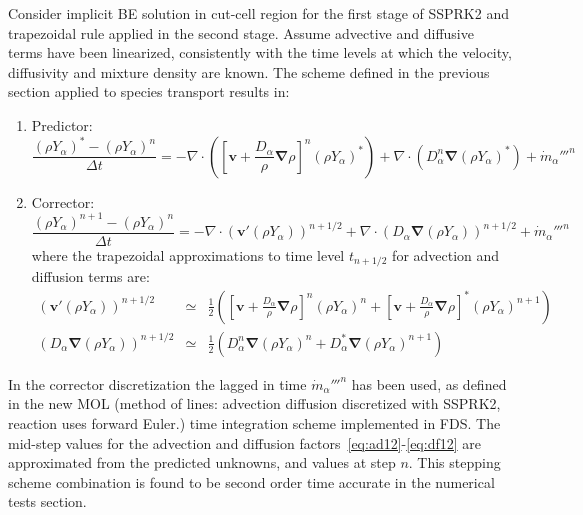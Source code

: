 Consider implicit BE solution in cut-cell region for the first stage of SSPRK2 and trapezoidal rule applied in the second stage. Assume advective and diffusive terms have been linearized, consistently with the time levels at which the velocity, diffusivity and mixture density are known. The scheme defined in the previous section applied to species transport results in:
%
\begin{enumerate}
  \item Predictor:
%
\begin{equation}
\frac{ (\rho Y_\alpha)^{*} - (\rho Y_\alpha)^n}{\Delta t} = - \nabla \cdot \left(  \left[ \mathbf{v} +
\frac{D_\alpha}{\rho} \boldsymbol{\nabla} \rho \right]^{n} (\rho Y_\alpha)^{*} \right) +
\nabla \cdot \left( D_\alpha^n \boldsymbol{\nabla}  (\rho Y_\alpha )^{*} \right) + \dot{m}_\alpha'''^{n} \label{eq:pred}
\end{equation}
%
  \item Corrector:
%
\begin{equation}
\frac{ (\rho Y_\alpha)^{n+1} - (\rho Y_\alpha)^n}{\Delta t} = - \nabla \cdot \left(  \mathbf{v}' (\rho Y_\alpha) \right)^{n+1/2} + \nabla \cdot \left( D_\alpha \boldsymbol{\nabla}  (\rho Y_\alpha ) \right)^{n+1/2} + \dot{m}_\alpha'''^{n} \label{eq:corr}
\end{equation}
%
where the trapezoidal approximations to time level $t_{n+1/2}$ for advection and diffusion terms are:
%
\begin{eqnarray}
  \left(  \mathbf{v}'(\rho Y_\alpha) \right)^{n+1/2} & \simeq &
  \frac{1}{2} \left( \left[ \mathbf{v} + \frac{D_\alpha}{\rho} \boldsymbol{\nabla} \rho \right]^n (\rho Y_\alpha)^{n} +
                           \left[ \mathbf{v} + \frac{D_\alpha}{\rho} \boldsymbol{\nabla} \rho \right]^* (\rho Y_\alpha)^{n+1} \right)
                           \label{eq:ad12}  \\
  \left( D_\alpha \boldsymbol{\nabla}  (\rho Y_\alpha ) \right)^{n+1/2}   & \simeq &
  \frac{1}{2} \left(  D_\alpha^{n} \boldsymbol{\nabla}  (\rho Y_\alpha )^{n} +
                            D_\alpha^* \boldsymbol{\nabla}  (\rho Y_\alpha )^{n+1}  \right) \label{eq:df12}
\end{eqnarray}
%
\end{enumerate}
%
In the corrector discretization the lagged in time $\dot{m}_\alpha'''^{n}$ has been used, as defined in the new MOL (method of lines: advection diffusion discretized with SSPRK2, reaction uses forward Euler.) time integration scheme implemented in FDS. The mid-step values for the advection and diffusion factors~\eqref{eq:ad12}-\eqref{eq:df12} are approximated from the predicted unknowns, and values at step $n$. This stepping scheme combination is found to be second order time accurate in the numerical tests section.


